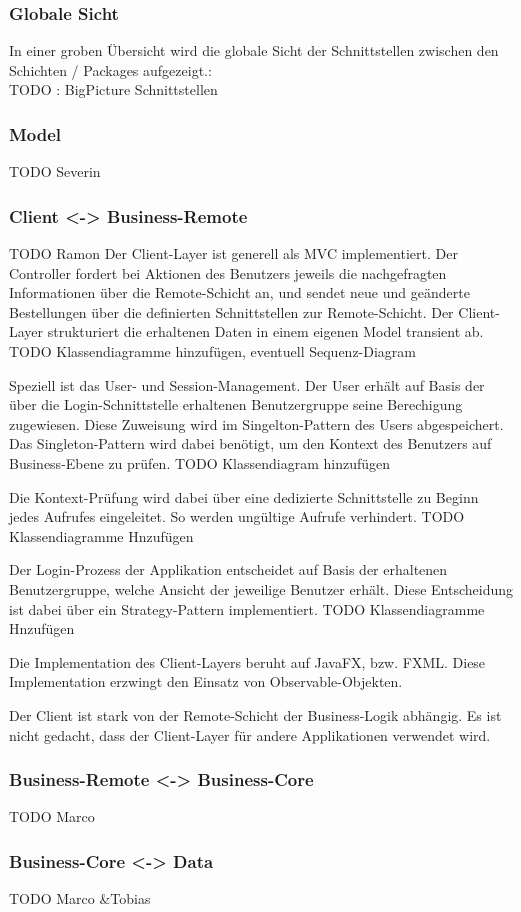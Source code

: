 \subsubsection{Globale Sicht}
In einer groben Übersicht wird die globale Sicht der Schnittstellen zwischen den Schichten / Packages aufgezeigt.:\\
TODO : BigPicture Schnittstellen

\subsubsection{Model}
TODO Severin
\subsubsection{Client <-> Business-Remote}
TODO Ramon
Der Client-Layer ist generell als MVC implementiert. Der Controller fordert bei Aktionen des Benutzers jeweils die nachgefragten Informationen über die Remote-Schicht an, und sendet neue und geänderte Bestellungen über die definierten Schnittstellen zur Remote-Schicht.
Der Client-Layer strukturiert die erhaltenen Daten in einem eigenen Model transient ab.
TODO Klassendiagramme hinzufügen, eventuell Sequenz-Diagram

Speziell ist das User- und Session-Management. Der User erhält auf Basis der über die Login-Schnittstelle erhaltenen Benutzergruppe seine Berechigung zugewiesen. Diese Zuweisung wird im Singelton-Pattern des Users abgespeichert.
Das Singleton-Pattern wird dabei benötigt, um den Kontext des Benutzers auf Business-Ebene zu prüfen.
TODO Klassendiagram hinzufügen

Die Kontext-Prüfung wird dabei über eine dedizierte Schnittstelle zu Beginn jedes Aufrufes eingeleitet. So werden ungültige Aufrufe verhindert.
TODO Klassendiagramme Hnzufügen

Der Login-Prozess der Applikation entscheidet auf Basis der erhaltenen Benutzergruppe, welche Ansicht der jeweilige Benutzer erhält. Diese Entscheidung ist dabei über ein Strategy-Pattern implementiert. 
TODO Klassendiagramme Hnzufügen

Die Implementation des Client-Layers beruht auf JavaFX, bzw. FXML. Diese Implementation erzwingt den Einsatz von Observable-Objekten.

Der Client ist stark von der Remote-Schicht der Business-Logik abhängig. Es ist nicht gedacht, dass der Client-Layer für andere Applikationen verwendet wird.


\subsubsection{Business-Remote <-> Business-Core}
TODO Marco
\subsubsection{Business-Core <-> Data}
TODO Marco \&Tobias
